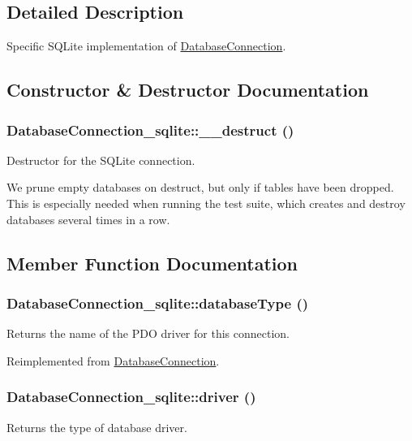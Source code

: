 \subsection{Detailed Description}
Specific SQLite implementation of \hyperlink{classDatabaseConnection}{DatabaseConnection}. 

\subsection{Constructor \& Destructor Documentation}
\hypertarget{classDatabaseConnection__sqlite_ad22467bf631a3f808f8cd90372e8514e}{
\subsubsection[{\_\-\_\-destruct}]{\setlength{\rightskip}{0pt plus 5cm}DatabaseConnection\_\-sqlite::\_\-\_\-destruct ()}}
\label{classDatabaseConnection__sqlite_ad22467bf631a3f808f8cd90372e8514e}
Destructor for the SQLite connection.

We prune empty databases on destruct, but only if tables have been dropped. This is especially needed when running the test suite, which creates and destroy databases several times in a row. 

\subsection{Member Function Documentation}
\hypertarget{classDatabaseConnection__sqlite_acafbe944024f6bbdf26c11dab3c6b534}{
\subsubsection[{databaseType}]{\setlength{\rightskip}{0pt plus 5cm}DatabaseConnection\_\-sqlite::databaseType ()}}
\label{classDatabaseConnection__sqlite_acafbe944024f6bbdf26c11dab3c6b534}
Returns the name of the PDO driver for this connection. 

Reimplemented from \hyperlink{classDatabaseConnection_a7dd7e76bc813c6a90a6d26a5529d67b0}{DatabaseConnection}.\hypertarget{classDatabaseConnection__sqlite_aa941f2ff6edc55833dfa21b282c8c0dc}{
\subsubsection[{driver}]{\setlength{\rightskip}{0pt plus 5cm}DatabaseConnection\_\-sqlite::driver ()}}
\label{classDatabaseConnection__sqlite_aa941f2ff6edc55833dfa21b282c8c0dc}
Returns the type of database driver.

